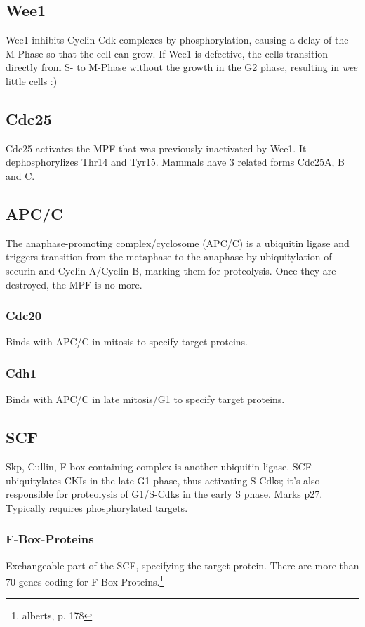 \documentclass{article}
\begin{document}
	\subsection{Wee1}
	Wee1 inhibits Cyclin-Cdk complexes by phosphorylation, causing a delay of the M-Phase so that the cell can grow. If Wee1 is defective, the cells transition directly from S- to M-Phase without the growth in the G2 phase, resulting in \textit{wee} little cells :)
	
	\subsection{Cdc25}
	Cdc25 activates the MPF that was previously inactivated by Wee1. It dephosphorylizes Thr14 and Tyr15. Mammals have 3 related forms Cdc25A, B and C.
	
	\subsection{APC/C}
	The anaphase-promoting complex/cyclosome (APC/C) is a ubiquitin ligase and triggers transition from the metaphase to the anaphase by ubiquitylation of securin and Cyclin-A/Cyclin-B, marking them for proteolysis. Once they are destroyed, the MPF is no more.
	
	\subsubsection{Cdc20}
	Binds with APC/C in mitosis to specify target proteins.
	
	\subsubsection{Cdh1}
	Binds with APC/C in late mitosis/G1 to specify target proteins.
	
	\subsection{SCF}
	Skp, Cullin, F-box containing complex is another ubiquitin ligase. SCF ubiquitylates CKIs in the late G1 phase, thus activating S-Cdks; it's also responsible for proteolysis of G1/S-Cdks in the early S phase. Marks p27. Typically requires phosphorylated targets.
	
	\subsubsection{F-Box-Proteins}
	Exchangeable part of the SCF, specifying the target protein. There are more than 70 genes coding for F-Box-Proteins.\footnote{alberts, p. 178}
	
\end{document}
